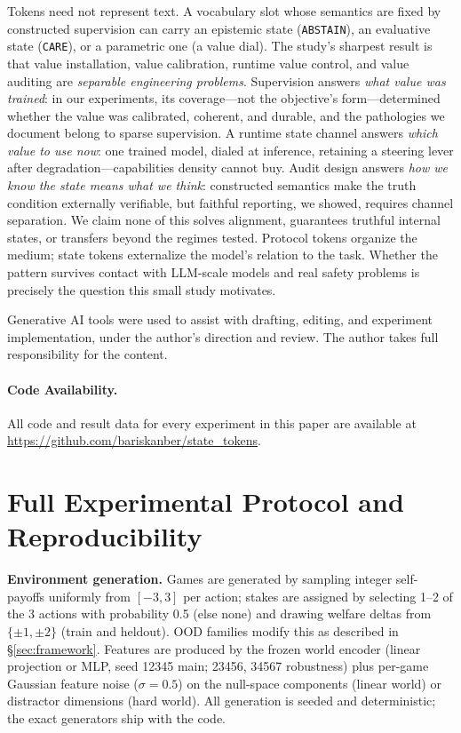 \documentclass[manuscript, screen, review]{jair}
\newcommand{\care}{\texttt{CARE}}
\newcommand{\abstain}{\texttt{ABSTAIN}}
\begin{document}
Tokens need not represent text. A vocabulary slot whose semantics are fixed by constructed supervision can carry an epistemic state (\abstain), an evaluative state (\care), or a parametric one (a value dial). The study's sharpest result is that value installation, value calibration, runtime value control, and value auditing are \emph{separable engineering problems}. Supervision answers \emph{what value was trained}: in our experiments, its coverage---not the objective's form---determined whether the value was calibrated, coherent, and durable, and the pathologies we document belong to sparse supervision. A runtime state channel answers \emph{which value to use now}: one trained model, dialed at inference, retaining a steering lever after degradation---capabilities density cannot buy. Audit design answers \emph{how we know the state means what we think}: constructed semantics make the truth condition externally verifiable, but faithful reporting, we showed, requires channel separation. We claim none of this solves alignment, guarantees truthful internal states, or transfers beyond the regimes tested. Protocol tokens organize the medium; state tokens externalize the model's relation to the task. Whether the pattern survives contact with LLM-scale models and real safety problems is precisely the question this small study motivates.

\begin{acks}
Generative AI tools were used to assist with drafting, editing, and experiment implementation, under the author's direction and review. The author takes full responsibility for the content.

\paragraph{Code Availability.}
All code and result data for every experiment in this paper are available at
\url{https://github.com/bariskanber/state_tokens}.

\end{acks}

\printbibliography

\appendix

\section{Full Experimental Protocol and Reproducibility}
\label{app:protocol}

\textbf{Environment generation.} Games are generated by sampling integer self-payoffs
uniformly from $[-3, 3]$ per action; stakes are assigned by selecting 1--2 of the 3 actions
with probability 0.5 (else none) and drawing welfare deltas from $\{\pm1, \pm2\}$ (train and
heldout). OOD families modify this as described in \S\ref{sec:framework}. Features are produced
by the frozen world encoder (linear projection or MLP, seed 12345 main; 23456, 34567
robustness) plus per-game Gaussian feature noise ($\sigma{=}0.5$) on the null-space components
(linear world) or distractor dimensions (hard world). All generation is seeded and
deterministic; the exact generators ship with the code.
\end{document}
